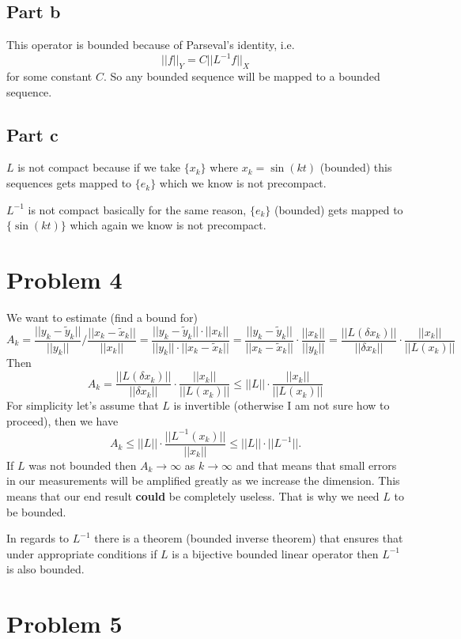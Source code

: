 \documentclass[12pt]{article}%
\begin{document}
\subsection*{Part b}
This operator is bounded because of Parseval's identity, i.e.
\[
	||f||_Y=C||L^{-1}f||_X
\]
for some constant $C$. So any bounded sequence will be mapped to a
bounded sequence.
\subsection*{Part c}
$L$ is not compact because if we take $\{x_k\}$ where $x_k=\sin(kt)$ (bounded)
this sequences gets mapped to $\{e_k\}$ which we know is not precompact.

$L^{-1}$ is not compact basically for the same reason, $\{e_k\}$ (bounded) gets
mapped to $\{\sin(kt)\}$ which again we know is not precompact.
\section*{Problem 4}
We want to estimate (find a bound for)
\[
	A_k
	=\frac{||y_k-\tilde{y}_k||}{||y_k||}\bigg/\frac{||x_k-\tilde{x}_k||}{||x_k||}
	=\frac{||y_k-\tilde{y}_k||\cdot||x_k||}{||y_k||\cdot||x_k-\tilde{x}_k||}
	=\frac{||y_k-\tilde{y}_k||}{||x_k-\tilde{x}_k||} \cdot
	\frac{||x_k||}{||y_k||}
	=\frac{||L(\delta x_k)||}{||\delta x_k||} \cdot \frac{||x_k||}{||L(x_k)||}
\]
Then
\[
A_k=\frac{||L(\delta x_k)||}{||\delta x_k||} \cdot \frac{||x_k||}{||L(x_k)||}\leq
||L||\cdot \frac{||x_k||}{||L(x_k)||}
\]
For simplicity let's assume that $L$ is invertible (otherwise I am not sure how
to proceed), then we have
\[
A_k\leq
||L||\cdot \frac{||L^{-1}(x_k)||}{||x_k||} \leq ||L|| \cdot ||L^{-1}||.
\]
If $L$ was not bounded then $A_k \to \infty$ as $k \to \infty$ and that means
that small errors in our measurements will be amplified greatly as we increase
the dimension. This means that our end result \textbf{could} be completely
useless. That is why we need $L$ to be bounded.

In regards to $L^{-1}$ there is a theorem (bounded inverse theorem) that
ensures that under appropriate conditions if $L$ is a bijective bounded linear
operator then $L^{-1}$ is also bounded.
\section*{Problem 5}
\end{document}
